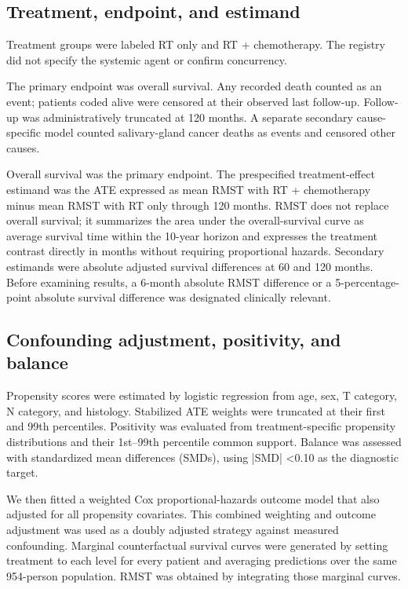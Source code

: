 \documentclass[10pt,twocolumn]{article}
\begin{document}
\subsection{Treatment, endpoint, and estimand}
Treatment groups were labeled RT only and RT + chemotherapy. The registry did not specify the systemic agent or confirm concurrency.\par
The primary endpoint was overall survival. Any recorded death counted as an event; patients coded alive were censored at their observed last follow-up. Follow-up was administratively truncated at 120 months. A separate secondary cause-specific model counted salivary-gland cancer deaths as events and censored other causes.\par
Overall survival was the primary endpoint. The prespecified treatment-effect estimand was the ATE expressed as mean RMST with RT + chemotherapy minus mean RMST with RT only through 120 months. RMST does not replace overall survival; it summarizes the area under the overall-survival curve as average survival time within the 10-year horizon and expresses the treatment contrast directly in months without requiring proportional hazards. Secondary estimands were absolute adjusted survival differences at 60 and 120 months. Before examining results, a 6-month absolute RMST difference or a 5-percentage-point absolute survival difference was designated clinically relevant.\par
\subsection{Confounding adjustment, positivity, and balance}
Propensity scores were estimated by logistic regression from age, sex, T category, N category, and histology. Stabilized ATE weights were truncated at their first and 99th percentiles. Positivity was evaluated from treatment-specific propensity distributions and their 1st--99th percentile common support. Balance was assessed with standardized mean differences (SMDs), using |SMD| <0.10 as the diagnostic target.\par
We then fitted a weighted Cox proportional-hazards outcome model that also adjusted for all propensity covariates. This combined weighting and outcome adjustment was used as a doubly adjusted strategy against measured confounding. Marginal counterfactual survival curves were generated by setting treatment to each level for every patient and averaging predictions over the same 954-person population. RMST was obtained by integrating those marginal curves.\par
\end{document}
